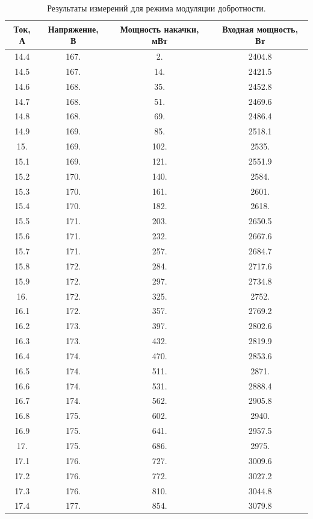 \documentclass[a4paper, 12pt]{article}
\begin{document}
\begin{table}[!htb]
	\centering
	\caption{Результаты измерений для режима модуляции добротности.}
	\begin{tabular}{|c|c|c|c|}
	\hline
	Ток, А & Напряжение, В & Мощность накачки, мВт & Входная мощность, Вт\\
	\hline
 14.4 & 167. & 2. & 2404.8 \\
 14.5 & 167. & 14. & 2421.5 \\
 14.6 & 168. & 35. & 2452.8 \\
 14.7 & 168. & 51. & 2469.6 \\
 14.8 & 168. & 69. & 2486.4 \\
 14.9 & 169. & 85. & 2518.1 \\
 15. & 169. & 102. & 2535. \\
 15.1 & 169. & 121. & 2551.9 \\
 15.2 & 170. & 140. & 2584. \\
 15.3 & 170. & 161. & 2601. \\
 15.4 & 170. & 182. & 2618. \\
 15.5 & 171. & 203. & 2650.5 \\
 15.6 & 171. & 232. & 2667.6 \\
 15.7 & 171. & 257. & 2684.7 \\
 15.8 & 172. & 284. & 2717.6 \\
 15.9 & 172. & 297. & 2734.8 \\
 16. & 172. & 325. & 2752. \\
 16.1 & 172. & 357. & 2769.2 \\
 16.2 & 173. & 397. & 2802.6 \\
 16.3 & 173. & 432. & 2819.9 \\
 16.4 & 174. & 470. & 2853.6 \\
 16.5 & 174. & 511. & 2871. \\
 16.6 & 174. & 531. & 2888.4 \\
 16.7 & 174. & 562. & 2905.8 \\
 16.8 & 175. & 602. & 2940. \\
 16.9 & 175. & 641. & 2957.5 \\
 17. & 175. & 686. & 2975. \\
 17.1 & 176. & 727. & 3009.6 \\
 17.2 & 176. & 772. & 3027.2 \\
 17.3 & 176. & 810. & 3044.8 \\
 17.4 & 177. & 854. & 3079.8 \\
 \hline
	\end{tabular}
\end{table}
\end{document}
